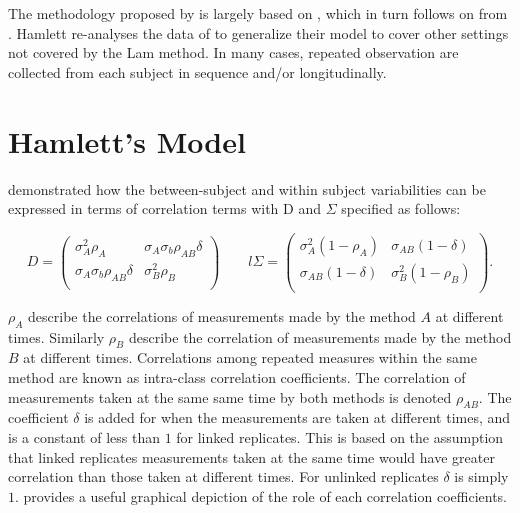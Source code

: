 \documentclass[12pt, a4paper]{report}
\theoremstyle{plain}
\theoremstyle{definition}
\theoremstyle{remark}
\begin{document}
The methodology proposed by \citet{ARoy2009} is largely based on \citet{hamlett}, which in turn follows on from \citet{lam}. Hamlett re-analyses the data of \citet{lam} to generalize their model to cover other settings not covered by the Lam method. In many cases, repeated observation are collected from each subject in sequence  and/or longitudinally.







\section{Hamlett's Model}

\citet{hamlett} demonstrated how the between-subject and within subject variabilities can be expressed in terms of
correlation terms with D and $\Sigma$ specified as follows:

\[
{D} = \left( \begin{array}{cc}
\sigma^2_{A}\rho_{A} & \sigma_{A}\sigma_{b}\rho_{AB}\delta \\
\sigma_{A}\sigma_{b}\rho_{AB}\delta & \sigma^2_{B}\rho_{B}\\

\end{array}\right)
\qquad
l{\Sigma} = \left(
\begin{array}{cc}
\sigma^2_{A}(1-\rho_{A}) & \sigma_{AB}(1-\delta)  \\
\sigma_{AB}(1-\delta) & \sigma^2_{B}(1-\rho_{B}) \\
\end{array}\right).
\]

$\rho_{A}$ describe the correlations of measurements made by the method $A$ at different times. Similarly $\rho_{B}$ describe the correlation of measurements made by the method $B$ at different times. Correlations among repeated measures within the same method are known as intra-class correlation coefficients.  The correlation of measurements taken at the same same time by both methods is denoted $\rho_{AB}$. The coefficient $\delta$ is added for when the measurements are taken at different times, and is a constant of less than $1$ for linked replicates. This is based on the assumption that linked replicates measurements taken at the same time would have greater correlation than those taken at different times. For unlinked replicates $\delta$ is simply $1$. \citet{hamlett} provides a useful graphical depiction of the role of each correlation coefficients.
\end{document}
